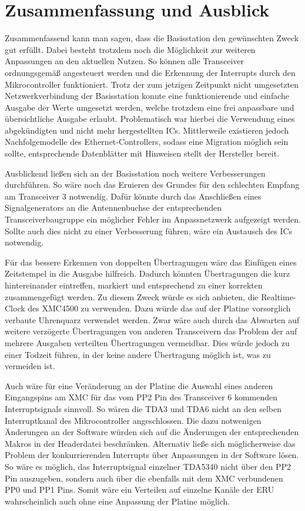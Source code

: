 \chapter{Zusammenfassung und Ausblick}
\label{sec:Zusammenfassung}
\pagestyle{scrheadings}
Zusammenfassend kann man sagen, dass die Basisstation den gewünschten Zweck gut erfüllt. Dabei besteht trotzdem noch die Möglichkeit zur weiteren Anpassungen an den aktuellen Nutzen. So können alle Transceiver ordnungsgemäß angesteuert werden und die Erkennung der Interrupts durch den Mikrocontroller funktioniert. Trotz der zum jetzigen Zeitpunkt nicht umgesetzten Netzwerkverbindung der Basisstation konnte eine funktionierende und einfache Ausgabe der Werte umgesetzt werden, welche trotzdem eine frei anpassbare und übersichtliche Ausgabe erlaubt. Problematisch war hierbei die Verwendung eines abgekündigten und nicht mehr hergestellten \acp{IC}. Mittlerweile existieren jedoch Nachfolgemodelle des Ethernet-Controllers, sodass eine Migration möglich sein sollte, entsprechende Datenblätter mit Hinweisen stellt der Hersteller bereit. 





Ausblickend ließen sich an der Basisstation noch weitere Verbesserungen durchführen.
So wäre noch das Eruieren des Grundes für den schlechten Empfang am Transceiver $3$ notwendig. Dafür könnte durch das Anschließen eines Signalgenerators an die Antennenbuchse der entsprechenden Transceiverbaugruppe ein möglicher Fehler im Anpassnetzwerk aufgezeigt werden. Sollte auch dies nicht zu einer Verbesserung führen, wäre ein Austausch des \acp{IC} notwendig.

Für das bessere Erkennen von doppelten Übertragungen wäre das Einfügen eines Zeitstempel in die Ausgabe hilfreich. Dadurch könnten Übertragungen die kurz hintereinander eintreffen, markiert und entsprechend zu einer korrekten zusammengefügt werden. Zu diesem Zweck würde es sich anbieten, die Realtime-Clock des XMC4500 zu verwenden. Dazu würde das auf der Platine vorsorglich verbaute Uhrenquarz verwendet werden. Zwar wäre auch durch das Abwarten auf weitere verzögerte Übertragungen von anderen Transceivern das Problem der auf mehrere Ausgaben verteilten Übertragungen vermeidbar. Dies würde jedoch zu einer Todzeit führen, in der keine andere Übertragung möglich ist, was zu vermeiden ist.

Auch wäre für eine Veränderung an der Platine die Auswahl eines anderen Eingangspins am XMC für das vom PP2 Pin des Transceiver 6 kommenden Interruptsignals sinnvoll. So wären die TDA3 und TDA6 nicht an den selben Interruptkanal des Mikrocontroller angeschlossen. Die dazu notwenigen Änderungen an der Software würden sich auf die Änderungen der entsprechenden Makros in der Headerdatei beschränken.
Alternativ ließe sich möglicherweise das Problem der konkurrierenden Interrupts über Anpassungen in der Software lösen. So wäre es möglich, das Interruptsignal einzelner TDA5340 nicht über den PP2 Pin auszugeben, sondern auch über die ebenfalls mit dem XMC verbundenen PP0 und PP1 Pins. Somit wäre ein Verteilen auf einzelne Kanäle der \ac{ERU} wahrscheinlich auch ohne eine Anpassung der Platine möglich.


